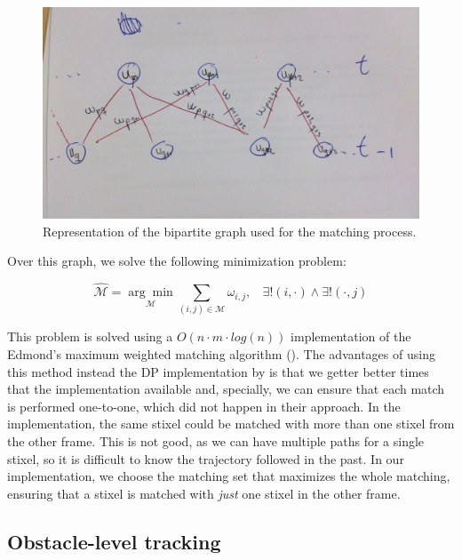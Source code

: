 \begin{figure}[h!]
\centering
\includegraphics[width=\textwidth]{bipartite_graph}
\caption{Representation of the bipartite graph used for the matching process.}\label{fig:cp04_bipartite_graph}
\end{figure}

Over this graph, we solve the following minimization problem:

\begin{equation}\label{eq:cp04_match_minimization}
\mathcal{\hat{M}}=\underset{\mathcal{M}}{\arg\min} \underset{(i, j) \in \mathcal{M}}{\sum} \omega_{i,j}, 
~~~~\exists! (i, \cdot) \wedge \exists! (\cdot, j)
\end{equation}

This problem is solved using a $O(n \cdot m \cdot log(n))$ implementation of the Edmond's maximum weighted matching algorithm (\cite{edmonds1965paths}). The advantages of using this method instead the \ac{DP} implementation by \cite{gunyel2012stixels} is that we getter better times that the implementation available and, specially, we can ensure that each match is performed one-to-one, which did not happen in their approach. In the \cite{gunyel2012stixels} implementation, the same stixel could be matched with more than one stixel from the other frame. This is not good, as we can have multiple paths for a single stixel, so it is difficult to know the trajectory followed in the past. In our implementation, we choose the matching set that maximizes the whole matching, ensuring that a stixel is matched with \emph{just} one stixel in the other frame.

\subsection{Obstacle-level tracking}\label{ch:chapter04_01_04}

